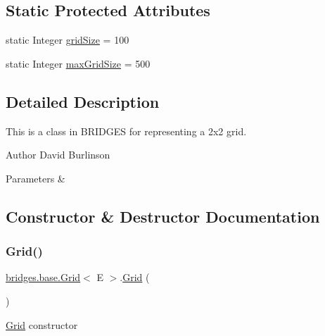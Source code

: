 \subsection*{Static Protected Attributes}
\begin{DoxyCompactItemize}
\item 
static Integer \mbox{\hyperlink{classbridges_1_1base_1_1_grid_aac54245e90ee9036b5c04fc68c3450dc}{grid\+Size}} = 100
\item 
static Integer \mbox{\hyperlink{classbridges_1_1base_1_1_grid_a39ff9a1d4fb83b5a2ee2d0031cea88e0}{max\+Grid\+Size}} = 500
\end{DoxyCompactItemize}


\subsection{Detailed Description}
This is a class in B\+R\+I\+D\+G\+ES for representing a 2x2 grid. 

\begin{DoxyAuthor}{Author}
David Burlinson 
\end{DoxyAuthor}

\begin{DoxyParams}{Parameters}
{\em } & \\
\hline
\end{DoxyParams}


\subsection{Constructor \& Destructor Documentation}
\mbox{\label{classbridges_1_1base_1_1_grid_aa621ffc958db8341f7ce37ed78944d51}} 
\subsubsection{\texorpdfstring{Grid()}{Grid()}\hspace{0.1cm}{\footnotesize\ttfamily [1/2]}}
{\footnotesize\ttfamily \mbox{\hyperlink{classbridges_1_1base_1_1_grid}{bridges.\+base.\+Grid}}$<$ E $>$.\mbox{\hyperlink{classbridges_1_1base_1_1_grid}{Grid}} (\begin{DoxyParamCaption}{ }\end{DoxyParamCaption})}

\mbox{\hyperlink{classbridges_1_1base_1_1_grid}{Grid}} constructor \mbox{\label{classbridges_1_1base_1_1_grid_aec6af5e5b69bc26d4de63594cc949bc5}} 
